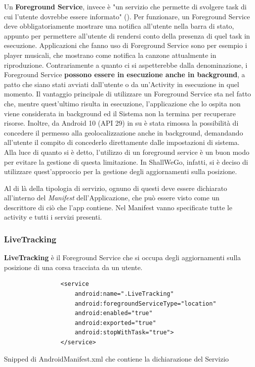                 Un \textbf{Foreground Service}, invece è "un servizio che permette di svolgere task di cui l'utente dovrebbe essere informato" (\cite{AndroidDocForeground}). Per funzionare, un Foreground Service deve obbligatoriamente mostrare una notifica all'utente nella barra di stato, appunto per permettere all'utente di rendersi conto della presenza di quel task in esecuzione. Applicazioni che fanno uso di Foreground Service sono per esempio i player musicali, che mostrano come notifica la canzone attualmente in riproduzione. Contrariamente a quanto ci si aspetterebbe dalla denominazione, i Foreground Service \textbf{possono essere in esecuzione anche in background}, a patto che siano stati avviati dall'utente o da un'Activity in esecuzione in quel momento. Il vantaggio principale di utilizzare un Foreground Service sta nel fatto che, mentre quest'ultimo risulta in esecuzione, l'applicazione che lo ospita non viene considerata in background ed il Sistema non la termina per recuperare risorse. Inoltre, da Android 10 (API 29) in su è stata rimossa la possibilità di concedere il permesso alla geolocalizzazione anche in background, demandando all'utente il compito di concederlo direttamente dalle impostazioni di sistema. Alla luce di quanto si è detto, l'utilizzo di un foreground service è un buon modo per evitare la gestione di questa limitazione. In ShallWeGo, infatti, si è deciso di utilizzare quest'approccio per la gestione degli aggiornamenti sulla posizione.

                Al di là della tipologia di servizio, ognuno di questi deve essere dichiarato all'interno del \textit{Manifest} dell'Applicazione, che può essere visto come un descrittore di ciò che l'app contiene. Nel Manifest vanno specificate tutte le activity e tutti i servizi presenti.

                \subsubsection{LiveTracking}
                    \textbf{LiveTracking} è il Foreground Service che si occupa degli aggiornamenti sulla posizione di una corsa tracciata da un utente.

                    \begin{center}
                        \begin{code}
                            \begin{verbatim}
                <service
                    android:name=".LiveTracking"
                    android:foregroundServiceType="location"
                    android:enabled="true"
                    android:exported="true"
                    android:stopWithTask="true">
                </service>
                            \end{verbatim}
                            \caption{Snipped di AndroidManifest.xml che contiene la dichiarazione del Servizio}
                        \end{code}
                    \end{center}
    
